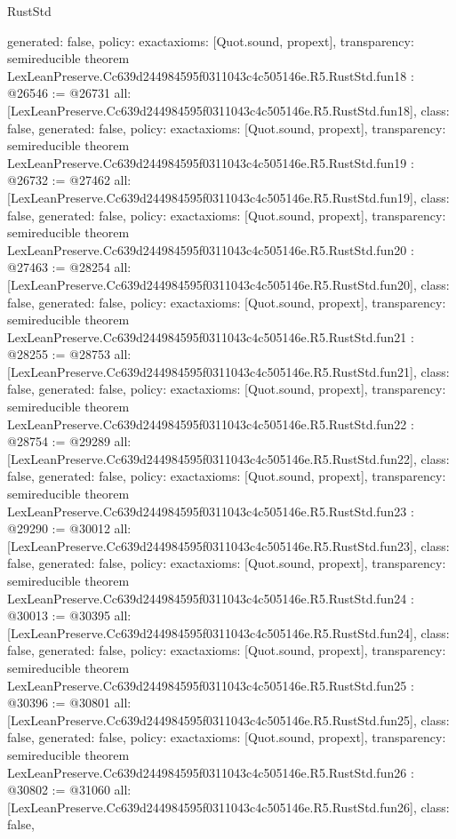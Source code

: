 \begin{lexlean}{RustStd}
\begin{coremodule}
{  generated: false,
  policy: exact{axioms: [Quot.sound, propext]},
  transparency: semireducible
}
theorem LexLeanPreserve.Cc639d244984595f0311043c4c505146e.R5.RustStd.fun18 : @26546 := @26731 {
  all: [LexLeanPreserve.Cc639d244984595f0311043c4c505146e.R5.RustStd.fun18],
  class: false,
  generated: false,
  policy: exact{axioms: [Quot.sound, propext]},
  transparency: semireducible
}
theorem LexLeanPreserve.Cc639d244984595f0311043c4c505146e.R5.RustStd.fun19 : @26732 := @27462 {
  all: [LexLeanPreserve.Cc639d244984595f0311043c4c505146e.R5.RustStd.fun19],
  class: false,
  generated: false,
  policy: exact{axioms: [Quot.sound, propext]},
  transparency: semireducible
}
theorem LexLeanPreserve.Cc639d244984595f0311043c4c505146e.R5.RustStd.fun20 : @27463 := @28254 {
  all: [LexLeanPreserve.Cc639d244984595f0311043c4c505146e.R5.RustStd.fun20],
  class: false,
  generated: false,
  policy: exact{axioms: [Quot.sound, propext]},
  transparency: semireducible
}
theorem LexLeanPreserve.Cc639d244984595f0311043c4c505146e.R5.RustStd.fun21 : @28255 := @28753 {
  all: [LexLeanPreserve.Cc639d244984595f0311043c4c505146e.R5.RustStd.fun21],
  class: false,
  generated: false,
  policy: exact{axioms: [Quot.sound, propext]},
  transparency: semireducible
}
theorem LexLeanPreserve.Cc639d244984595f0311043c4c505146e.R5.RustStd.fun22 : @28754 := @29289 {
  all: [LexLeanPreserve.Cc639d244984595f0311043c4c505146e.R5.RustStd.fun22],
  class: false,
  generated: false,
  policy: exact{axioms: [Quot.sound, propext]},
  transparency: semireducible
}
theorem LexLeanPreserve.Cc639d244984595f0311043c4c505146e.R5.RustStd.fun23 : @29290 := @30012 {
  all: [LexLeanPreserve.Cc639d244984595f0311043c4c505146e.R5.RustStd.fun23],
  class: false,
  generated: false,
  policy: exact{axioms: [Quot.sound, propext]},
  transparency: semireducible
}
theorem LexLeanPreserve.Cc639d244984595f0311043c4c505146e.R5.RustStd.fun24 : @30013 := @30395 {
  all: [LexLeanPreserve.Cc639d244984595f0311043c4c505146e.R5.RustStd.fun24],
  class: false,
  generated: false,
  policy: exact{axioms: [Quot.sound, propext]},
  transparency: semireducible
}
theorem LexLeanPreserve.Cc639d244984595f0311043c4c505146e.R5.RustStd.fun25 : @30396 := @30801 {
  all: [LexLeanPreserve.Cc639d244984595f0311043c4c505146e.R5.RustStd.fun25],
  class: false,
  generated: false,
  policy: exact{axioms: [Quot.sound, propext]},
  transparency: semireducible
}
theorem LexLeanPreserve.Cc639d244984595f0311043c4c505146e.R5.RustStd.fun26 : @30802 := @31060 {
  all: [LexLeanPreserve.Cc639d244984595f0311043c4c505146e.R5.RustStd.fun26],
  class: false,
}
\end{coremodule}
\end{lexlean}
